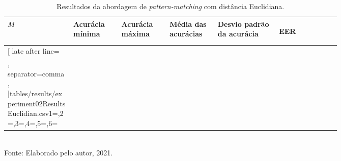 \begin{table}[H]
	\newcommand{\mc}[3]{\multicolumn{#1}{#2}{#3}}
	\begin{center}
		\caption{Resultados da abordagem de \textit{pattern-matching} com distância Euclidiana.}
		\begin{tabular}{|p{0.15\linewidth}|p{0.11\linewidth}|p{0.11\linewidth}|p{0.11\linewidth}|p{0.14\linewidth}|p{0.14\linewidth}|}\hline
			\rowcolor{tcA}
			\centering\textbf{$M$} & \centering\textbf{Acurácia mínima} & \centering\textbf{Acurácia máxima} & \centering\textbf{Média das acurácias} & \centering\textbf{Desvio padrão da acurácia} & \begin{center}\textbf{EER}\end{center}\\\hline

			\rowcolor{tcB}
			\csvreader[
			late after line=\\\hline\rowcolor{tcB},%
			separator=comma,
			]{tables/results/experiment02ResultsEuclidian.csv}{1=\eme,2=\minAccu,3=\maxAccu,4=\meanAccu,5=\stdDev,6=\eer}{\centering\eme\% & \centering\StrSubstitute[0]{\minAccu}{.}{,} & \centering\StrSubstitute[0]{\maxAccu}{.}{,} & \centering\StrSubstitute[0]{\meanAccu}{.}{,} & \centering\StrSubstitute[0]{\stdDev}{.}{,} & \StrSubstitute[0]{\eer}{.}{,}}

		\end{tabular}
		\label{tab:experiment02ResultsEuclidian}
		\\Fonte: Elaborado pelo autor, 2021.
	\end{center}
\end{table}

